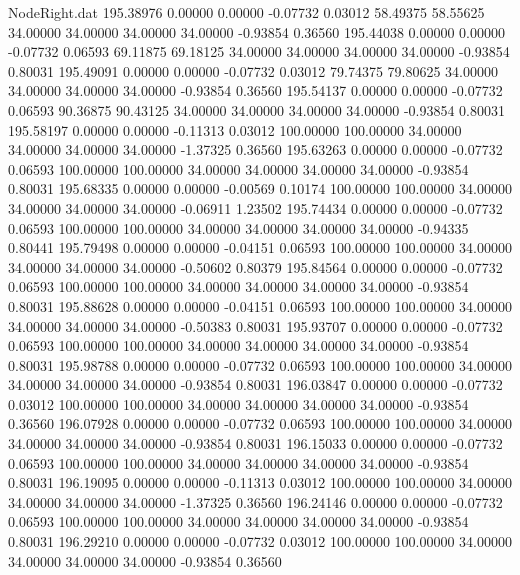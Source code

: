 \begin{filecontents}{NodeRight.dat}
 195.38976    0.00000    0.00000    -0.07732    0.03012   58.49375   58.55625   34.00000   34.00000   34.00000   34.00000   -0.93854    0.36560
 195.44038    0.00000    0.00000    -0.07732    0.06593   69.11875   69.18125   34.00000   34.00000   34.00000   34.00000   -0.93854    0.80031
 195.49091    0.00000    0.00000    -0.07732    0.03012   79.74375   79.80625   34.00000   34.00000   34.00000   34.00000   -0.93854    0.36560
 195.54137    0.00000    0.00000    -0.07732    0.06593   90.36875   90.43125   34.00000   34.00000   34.00000   34.00000   -0.93854    0.80031
 195.58197    0.00000    0.00000    -0.11313    0.03012  100.00000  100.00000   34.00000   34.00000   34.00000   34.00000   -1.37325    0.36560
 195.63263    0.00000    0.00000    -0.07732    0.06593  100.00000  100.00000   34.00000   34.00000   34.00000   34.00000   -0.93854    0.80031
 195.68335    0.00000    0.00000    -0.00569    0.10174  100.00000  100.00000   34.00000   34.00000   34.00000   34.00000   -0.06911    1.23502
 195.74434    0.00000    0.00000    -0.07732    0.06593  100.00000  100.00000   34.00000   34.00000   34.00000   34.00000   -0.94335    0.80441
 195.79498    0.00000    0.00000    -0.04151    0.06593  100.00000  100.00000   34.00000   34.00000   34.00000   34.00000   -0.50602    0.80379
 195.84564    0.00000    0.00000    -0.07732    0.06593  100.00000  100.00000   34.00000   34.00000   34.00000   34.00000   -0.93854    0.80031
 195.88628    0.00000    0.00000    -0.04151    0.06593  100.00000  100.00000   34.00000   34.00000   34.00000   34.00000   -0.50383    0.80031
 195.93707    0.00000    0.00000    -0.07732    0.06593  100.00000  100.00000   34.00000   34.00000   34.00000   34.00000   -0.93854    0.80031
 195.98788    0.00000    0.00000    -0.07732    0.06593  100.00000  100.00000   34.00000   34.00000   34.00000   34.00000   -0.93854    0.80031
 196.03847    0.00000    0.00000    -0.07732    0.03012  100.00000  100.00000   34.00000   34.00000   34.00000   34.00000   -0.93854    0.36560
 196.07928    0.00000    0.00000    -0.07732    0.06593  100.00000  100.00000   34.00000   34.00000   34.00000   34.00000   -0.93854    0.80031
 196.15033    0.00000    0.00000    -0.07732    0.06593  100.00000  100.00000   34.00000   34.00000   34.00000   34.00000   -0.93854    0.80031
 196.19095    0.00000    0.00000    -0.11313    0.03012  100.00000  100.00000   34.00000   34.00000   34.00000   34.00000   -1.37325    0.36560
 196.24146    0.00000    0.00000    -0.07732    0.06593  100.00000  100.00000   34.00000   34.00000   34.00000   34.00000   -0.93854    0.80031
 196.29210    0.00000    0.00000    -0.07732    0.03012  100.00000  100.00000   34.00000   34.00000   34.00000   34.00000   -0.93854    0.36560

\end{filecontents}

